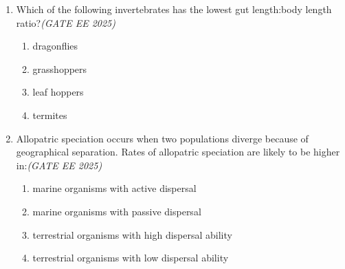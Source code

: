 \documentclass[11pt,a4paper]{article}
\begin{document}
\begin{enumerate}[leftmargin=*,label=\textbf{Q.\arabic*}]
\item Which of the following invertebrates has the lowest gut length:body length ratio?\hfill \textit{(GATE EE 2025)}
\begin{multicols}{2}
\begin{enumerate}[label=(\Alph*)]
\item dragonflies
\item grasshoppers
\item leaf hoppers
\item termites
\end{enumerate}
\end{multicols}

\item Allopatric speciation occurs when two populations diverge because of geographical separation. Rates of allopatric speciation are likely to be higher in:\hfill \textit{(GATE EE 2025)}

\begin{enumerate}[label=(\Alph*)]
\item marine organisms with active dispersal
\item marine organisms with passive dispersal
\item terrestrial organisms with high dispersal ability
\item terrestrial organisms with low dispersal ability
\end{enumerate}

\end{enumerate}
\end{document}
